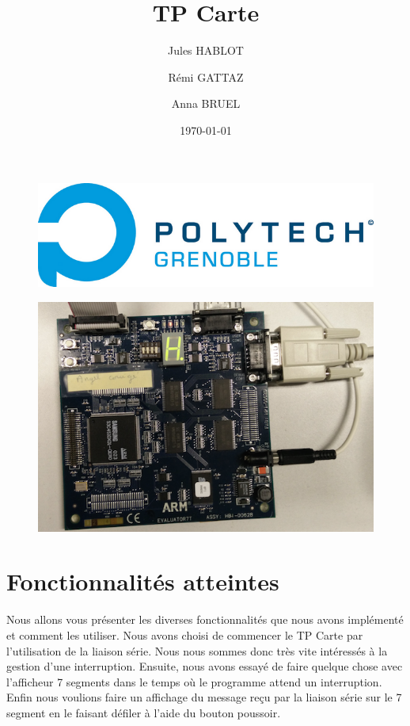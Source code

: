 \documentclass[a4paper, 10pt]{article}
\title{\Huge{TP Carte}}
\author{Jules HABLOT \and Rémi GATTAZ \and Anna BRUEL}
\date{\today}
\begin{document}
\maketitle

\begin{figure}[hc]
	\centering
	\includegraphics[scale=2.5]{logo_pg.png}
\end{figure}

\begin{figure}[hbc]
	\centering
	\includegraphics[scale=1.40]{carte2}
\end{figure}

\clearpage

\section{Fonctionnalités atteintes}

Nous allons vous présenter les diverses fonctionnalités que nous avons implémenté et comment les utiliser. Nous avons choisi de commencer le TP Carte par l'utilisation de la liaison série. Nous nous sommes donc très vite intéressés à la gestion d'une interruption. Ensuite, nous avons essayé de faire quelque chose avec l'afficheur 7 segments dans le temps où le programme attend un interruption. Enfin nous voulions faire un affichage du message reçu par la liaison série sur le 7 segment en le faisant défiler à l'aide du bouton poussoir.
\end{document}
